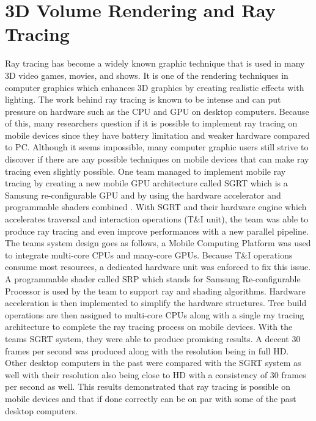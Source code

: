 \documentclass{article}
\begin{document}
\section{3D Volume Rendering and Ray Tracing}
  Ray tracing has become a widely known graphic technique that is used in many 3D video games, movies, and shows. It is one of the rendering techniques in computer graphics which enhances 3D graphics by creating realistic effects with lighting. The work behind ray tracing is known to be intense and can put pressure on hardware such as the CPU and GPU on desktop computers. Because of this, many researchers question if it is possible to implement ray tracing on mobile devices since they have battery limitation and weaker hardware compared to PC. Although it seems impossible, many computer graphic users still strive to discover if there are any possible techniques on mobile devices that can make ray tracing even slightly possible. One team managed to implement mobile ray tracing by creating a new mobile GPU architecture called SGRT which is a Samsung re-configurable GPU and by using the hardware accelerator and programmable shaders combined \cite{10.1145/2543651.2543670}. With SGRT and their hardware engine which accelerates traversal and interaction operations (T&I unit), the team was able to produce ray tracing and even improve performances with a new parallel pipeline. The teams system design goes as follows, a Mobile Computing Platform was used to integrate multi-core CPUs and many-core GPUs. Because T&I operations consume most resources, a dedicated hardware unit was enforced to fix this issue. A programmable shader called SRP which stands for Samsung Re-configurable Processor is used by the team to support ray and shading algorithms. Hardware acceleration is then implemented to simplify the hardware structures. Tree build operations are then assigned to multi-core CPUs along with a single ray tracing architecture to complete the ray tracing process on mobile devices. With the teams SGRT system, they were able to produce promising results. A decent 30 frames per second was produced along with the resolution being in full HD. Other desktop computers in the past were compared with the SGRT system as well with their resolution also being close to HD with a consistency of 30 frames per second as well. This results demonstrated that ray tracing is possible on mobile devices and that if done correctly can be on par with some of the past desktop computers.
  
\end{document}
